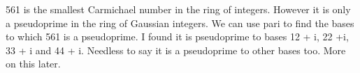 \documentclass[12pt]{article}
\begin{document}
561  is  the  smallest  Carmichael  number  in  the  ring of
integers. However  it is  only  a  pseudoprime  in the ring
of  Gaussian  integers.  We  can  use  pari to  find
the  bases  to  which  561  is  a  pseudoprime.  I  
found it  is   pseudoprime to bases  12  +  i,  22  +i,
33  +  i  and  44  +  i.  Needless  to  say  it is  a
pseudoprime to  other  bases  too. More  on  this later.
\end{document}
